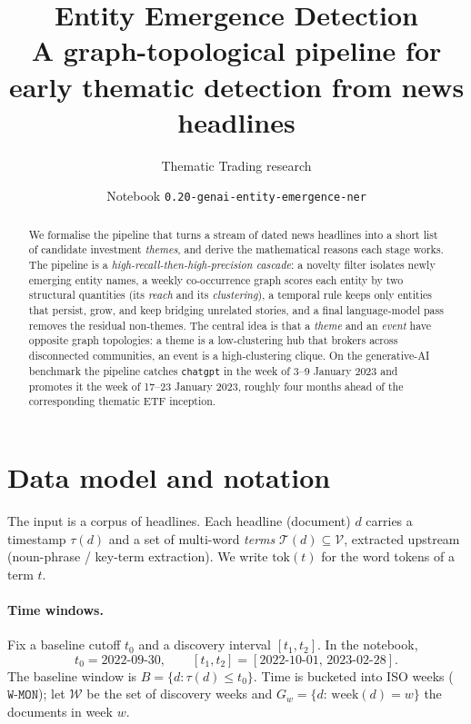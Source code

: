 \documentclass[11pt]{article}
\title{\textbf{Entity Emergence Detection}\\[2pt]
\large A graph-topological pipeline for early thematic detection from news headlines}
\author{Thematic Trading research}
\date{Notebook \texttt{0.20-genai-entity-emergence-ner}}
\newcommand{\Terms}{\mathcal{T}}                          %
\newcommand{\Vocab}{\mathcal{V}}                          %
\newcommand{\Wset}{\mathcal{W}}                           %
\newcommand{\Gw}{G_{w}}                                   %
\theoremstyle{definition}
\theoremstyle{remark}
\begin{document}
\maketitle

\begin{abstract}
We formalise the pipeline that turns a stream of dated news headlines into a short list
of candidate investment \emph{themes}, and derive the mathematical reasons each stage
works. The pipeline is a \emph{high-recall-then-high-precision cascade}: a novelty filter
isolates newly emerging entity names, a weekly co-occurrence graph scores each entity by
two structural quantities (its \emph{reach} and its \emph{clustering}), a temporal rule
keeps only entities that persist, grow, and keep bridging unrelated stories, and a final
language-model pass removes the residual non-themes. The central idea is that a
\emph{theme} and an \emph{event} have opposite graph topologies: a theme is a low-clustering
hub that brokers across disconnected communities, an event is a high-clustering clique.
On the generative-AI benchmark the pipeline catches \texttt{chatgpt} in the week of
3--9 January 2023 and promotes it the week of 17--23 January 2023, roughly four months
ahead of the corresponding thematic ETF inception.
\end{abstract}

\section{Data model and notation}

The input is a corpus of headlines. Each headline (document) $d$ carries a timestamp
$\tau(d)$ and a set of multi-word \emph{terms} $\Terms(d)\subseteq\Vocab$, extracted upstream
(noun-phrase / key-term extraction). We write $\mathrm{tok}(t)$ for the word tokens of a
term $t$.

\paragraph{Time windows.}
Fix a baseline cutoff $t_0$ and a discovery interval $[t_1,t_2]$. In the notebook,
\[
t_0 = \text{2022-09-30},\qquad [t_1,t_2] = [\text{2022-10-01},\,\text{2023-02-28}].
\]
The baseline window is $B=\{d:\tau(d)\le t_0\}$. Time is bucketed into ISO weeks
($\texttt{W-MON}$); let $\Wset$ be the set of discovery weeks and $\Gw=\{d:\,\text{week}(d)=w\}$
the documents in week $w$.
\end{document}
